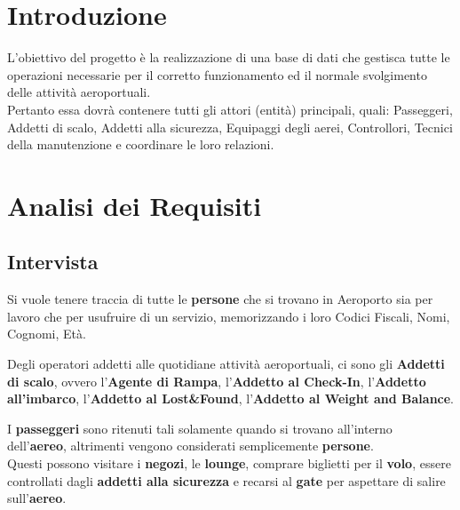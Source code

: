 
\newpage

\section{Introduzione}

\textsf{\small L'obiettivo del progetto è la realizzazione di una base di dati che gestisca tutte le operazioni necessarie per il corretto funzionamento ed il normale svolgimento delle attività aeroportuali.}\\
\textsf{\small Pertanto essa dovrà contenere tutti gli attori (entità) principali, quali: Passeggeri, Addetti di scalo, Addetti alla sicurezza, Equipaggi degli aerei, Controllori, Tecnici della manutenzione e coordinare le loro relazioni.}\\


\section{Analisi dei Requisiti}

\subsection{Intervista}

\textsf{\small Si vuole tenere traccia di tutte le \textbf{persone} che si trovano in Aeroporto sia per lavoro che per usufruire di un servizio, memorizzando i loro Codici Fiscali, Nomi, Cognomi, Età.}\break %

\textsf{\small Degli operatori addetti alle quotidiane attività aeroportuali, ci sono gli \textbf{Addetti di scalo}, ovvero l'\textbf{Agente di Rampa}, l'\textbf{Addetto al Check-In}, l'\textbf{Addetto all'imbarco}, l'\textbf{Addetto al Lost\&Found}, l'\textbf{Addetto al Weight and Balance}.}\break

\textsf{\small I \textbf{passeggeri} sono ritenuti tali solamente quando si trovano all'interno dell'\textbf{aereo}, altrimenti vengono considerati semplicemente \textbf{persone}.}\\
\textsf{\small Questi possono visitare i \textbf{negozi}, le \textbf{lounge}, comprare biglietti per il \textbf{volo}, essere controllati dagli \textbf{addetti alla sicurezza} e recarsi al \textbf{gate} per aspettare di salire sull'\textbf{aereo}.}\break

